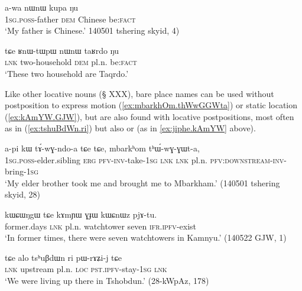 \begin{exe}
\ex \label{ex:kupa.Nu}
\gll  a-wa nɯnɯ kupa ŋu \\
\textsc{1sg}.\textsc{poss}-father \textsc{dem} Chinese be:\textsc{fact}  \\
\glt `My father is Chinese.' 140501 tshering skyid, 4)
\end{exe}

\begin{exe}
\ex \label{ex:taRdo.Nu}
\gll  tɕe ʁnɯ-tɯpɯ nɯnɯ taʁrdo ŋu  \\
\textsc{lnk} two-household \textsc{dem} pl.n. be:\textsc{fact} \\
\glt `These two household are Taqrdo.' 
\end{exe}

Like other locative nouns (§ XXX), bare place names can be used without postposition to express motion (\ref{ex:mbarkhOm.thWwGGWta}) or static location (\ref{ex:kAmYW.GJW}), but are also found with locative postpositions, most often  as in (\ref{ex:tshuBdWn.ri}) but also  or  (as in \ref{ex:jiphe.kAmYW} above).

\begin{exe}
\ex \label{ex:mbarkhOm.thWwGGWta}
 \gll a-pi kɯ tɤ́-wɣ-ndo-a tɕe tɕe, mbarkʰom tʰɯ́-wɣ-ɣɯt-a, \\
 \textsc{1sg}.\textsc{poss}-elder.sibling  \textsc{erg} \textsc{pfv}-\textsc{inv}-take-\textsc{1sg} \textsc{lnk} \textsc{lnk} pl.n.   \textsc{pfv:downstream}-\textsc{inv}-bring-\textsc{1sg}  \\
\glt `My elder brother took me and brought me to Mbarkham.' (140501 tshering skyid, 28)
\end{exe}

\begin{exe}
\ex \label{ex:kAmYW.GJW}
 \gll  kɯɕɯŋgɯ tɕe kɤmɲɯ ɣɟɯ kɯɕnɯz pjɤ-tu. \\
 former.days \textsc{lnk} pl.n. watchtower  seven \textsc{ifr}.\textsc{ipfv}-exist \\
 \glt `In former times, there were seven watchtowers in Kamnyu.' (140522 GJW, 1)
\end{exe}

\begin{exe}
\ex \label{ex:tshuBdWn.ri}
 \gll  tɕe alo tsʰuβdɯn ri pɯ-rɤʑi-j tɕe \\
 \textsc{lnk} upstream pl.n. \textsc{loc} \textsc{pst}.\textsc{ipfv}-stay-\textsc{1sg} \textsc{lnk} \\
 \glt `We were living up there in Tshobdun.' (28-kWpAz, 178)
\end{exe}

